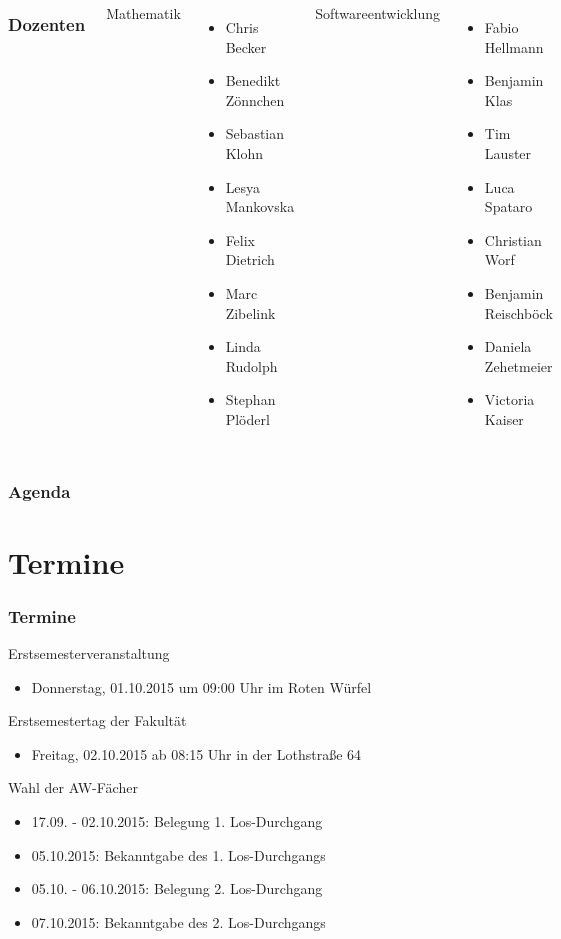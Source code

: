 \documentclass{beamer}
\begin{document}
	\begin{frame}
		\begin{columns}[t]
			\frametitle{Dozenten}
			Mathematik
			\begin{itemize}
				\item Chris Becker
				\item Benedikt Zönnchen
				\item Sebastian Klohn
				\item Lesya Mankovska
				\item Felix Dietrich
				\item Marc Zibelink
				\item Linda Rudolph
				\item Stephan Plöderl
			\end{itemize}
			Softwareentwicklung
			\begin{itemize}
				\item Fabio Hellmann
				\item Benjamin Klas
				\item Tim Lauster
				\item Luca Spataro
				\item Christian Worf
				\item Benjamin Reischböck
				\item Daniela Zehetmeier
				\item Victoria Kaiser
			\end{itemize}
		\end{columns}
	\end{frame}
	
	\begin{frame}
		\frametitle{Agenda}
		\tableofcontents
	\end{frame}
	
	\section{Termine}
	\begin{frame}
		\frametitle{Termine}
		Erstsemesterveranstaltung
		\begin{itemize}
			\item Donnerstag, 01.10.2015 um 09:00 Uhr im Roten Würfel
		\end{itemize}
		\pause
		Erstsemestertag der Fakultät
		\begin{itemize}
			\item Freitag, 02.10.2015 ab 08:15 Uhr in der Lothstraße 64
		\end{itemize}
		\pause
		Wahl der AW-Fächer
		\begin{itemize}
			\item 17.09. - 02.10.2015: Belegung 1. Los-Durchgang
			\item 05.10.2015: Bekanntgabe des 1. Los-Durchgangs
			\item 05.10. - 06.10.2015: Belegung 2. Los-Durchgang
			\item 07.10.2015: Bekanntgabe des 2. Los-Durchgangs
		\end{itemize}
	\end{frame}
	
\end{document}
